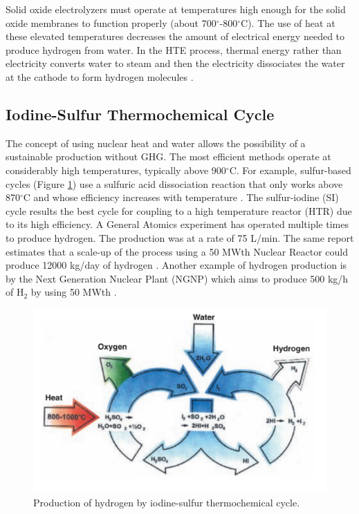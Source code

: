\documentclass{anstrans}
\begin{document}
Solid oxide electrolyzers must operate at temperatures high enough for the solid oxide membranes to function properly (about 700$^{\circ}$-800$^{\circ}$C). The use of heat at these elevated temperatures decreases the amount of electrical energy needed to produce hydrogen from water. In the HTE process, thermal energy rather than electricity converts water to steam and then the electricity dissociates the water at the cathode to form hydrogen molecules \cite{xu_introduction_2017}.

\subsection{Iodine-Sulfur Thermochemical Cycle}

The concept of using nuclear heat and water allows the possibility of a sustainable production without GHG. The most efficient methods operate at considerably high temperatures, typically above 900$^{\circ}$C. For example, sulfur-based cycles (Figure \ref{fig:isulfur}) use a sulfuric acid dissociation reaction that only works above 870$^{\circ}$C and whose efficiency increases with temperature \cite{cea_gas-cooled_2006}. The sulfur-iodine (SI) cycle results the best cycle for coupling to a high temperature reactor (HTR) due to its high efficiency. A General Atomics experiment has operated multiple times to produce hydrogen. The production was at a rate of 75 L/min. The same report estimates that a scale-up of the process using a 50 MWth Nuclear Reactor could produce 12000 kg/day of hydrogen \cite{benjamin_russ_sulfur_2009}.
Another example of hydrogen production is by the Next Generation Nuclear Plant (NGNP) \cite{macdonald_ngnp_2003} which aims to produce 500 kg/h of H$_2$ by using 50 MWth \cite{cea_gas-cooled_2006}.

\begin{figure}[H]
	\centering
	\includegraphics[width=0.85\linewidth]{figures/iodine-sulfur.png}
	\hfill
	\caption{Production of hydrogen by iodine-sulfur thermochemical cycle.}
	\label{fig:isulfur}
\end{figure}
\end{document}
